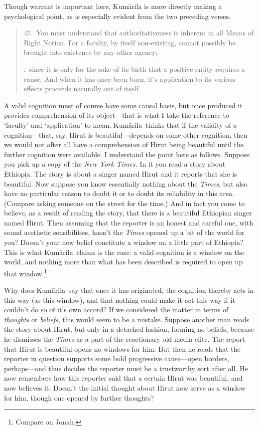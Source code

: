 \documentclass[11pt,letterpaper,oneside]{amsart}
\newenvironment{squote}{\begin{quote}\sf\small}{\rm\end{quote}} %
\newcommand{\kum}{Kum\={a}rila}
\begin{document}
Though warrant is important here, Kum\=arila is more directly making a psychological point, as is especially evident from the two preceding verses.\begin{squote}47.\ You must understand that authoritativeness is inherent in all Means of Right Notion. For a faculty, by itself non-existing, cannot possibly be brought into existence by any other agency;

.\ since it is only for the sake of its birth that a positive entity requires a cause. And when it has once been born, it's application to its various effects proceeds naturally out of itself.\end{squote} A valid cognition must of course have some causal basis, but once produced it provides comprehension of its object---that is what I take the reference to `faculty' and `application' to mean. \kum\ thinks that if the validity of a cognition---that, say, Hirut is beautiful---depends on some other cognition, then we would not after all have a comprehension of Hirut being beautiful until the further cognition were available. I understand the point here as follows. Suppose you pick up a copy of the \emph{New York Times.} In it you read a story about Ethiopia. The story is about a singer named Hirut and it reports that she is beautiful. Now suppose you know essentially nothing about the \emph{Times}, but also have no particular reason to doubt it or to doubt its reliability in this area. (Compare asking someone on the street for the time.) And in fact you come to believe, as a result of reading the story, that there is a beautiful Ethiopian singer named Hirut. Then assuming that the reporter is an honest and careful one, with sound aesthetic sensibilities, hasn't the \emph{Times} opened up a bit of the world for you? Doesn't your new belief constitute a window on a little part of Ethiopia? This is what \kum\ claims is the case: a valid cognition is a window on the world, and nothing more than what has been described is required to open up that window.\footnote{Compare \citet[pp.\ 66--7]{kripke1972naming} on Jonah.}

Why does \kum\ say that once it has originated, the cognition thereby acts in this way (as this window), and that nothing could make it act this way if it couldn't do so of it's own accord? If we considered the matter in terms of \emph{thoughts} or \emph{beliefs}, this would seem to be a mistake. Suppose another man reads the story about Hirut, but only in a detached fashion, forming no beliefs, because he dismisses the \emph{Times} as a part of the reactionary old-media elite. The report that Hirut is beautiful opens no windows for him. But then he reads that the reporter in question supports some bold progressive cause---open borders, perhaps---and thus decides the reporter must be a trustworthy sort after all. He now remembers how this reporter said that a certain Hirut was beautiful, and now believes it. Doesn't the initial thought about Hirut now serve as a window for him, though one opened by further thoughts?
\end{document}
